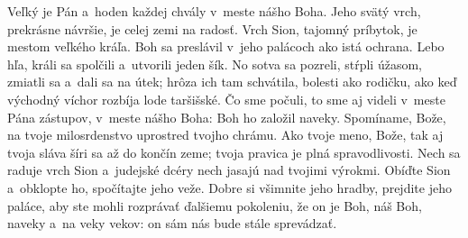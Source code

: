 Veľký je Pán a~hoden každej chvály
v~meste nášho Boha.
\versseparator
Jeho svätý vrch, prekrásne návršie, je celej zemi na radosť.
Vrch Sion, tajomný príbytok,
je mestom veľkého kráľa.
\versseparator
Boh sa preslávil v~jeho palácoch
ako istá ochrana.
\versseparator
Lebo hľa, králi sa spolčili
a~utvorili jeden šík.
\versseparator
No sotva sa pozreli, stŕpli úžasom,
zmiatli sa a~dali sa na útek;
hrôza ich tam schvátila,
\versseparator
bolesti ako rodičku,
ako keď východný víchor
rozbíja lode taršišské.
\versseparator
Čo sme počuli, to sme aj videli
v~meste Pána zástupov,
v~meste nášho Boha:
Boh ho založil naveky.
\versseparator
Spomíname, Bože, na tvoje milosrdenstvo
uprostred tvojho chrámu.
\versseparator
Ako tvoje meno, Bože,
tak aj tvoja sláva šíri sa až do končín zeme;
tvoja pravica je plná spravodlivosti.
\versseparator
Nech sa raduje vrch Sion a~judejské dcéry nech jasajú
nad tvojimi výrokmi.
\versseparator
Obíďte Sion a~obklopte ho,
spočítajte jeho veže.
\versseparator
Dobre si všimnite jeho hradby,
prejdite jeho paláce,
aby ste mohli rozprávať ďalšiemu pokoleniu,
\versseparator
že on je Boh, náš Boh,
naveky a~na veky vekov:
on sám nás bude stále sprevádzať.